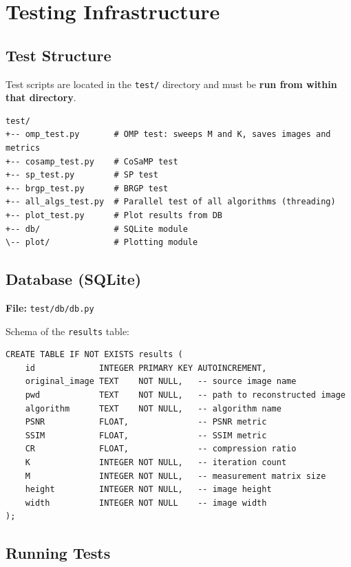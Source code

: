 \documentclass[12pt,a4paper]{article}
\newcommand{\cs}[1]{\texttt{#1}}          %
\begin{document}
\section{Testing Infrastructure}

\subsection{Test Structure}

Test scripts are located in the \cs{test/} directory and must be
\textbf{run from within that directory}.

\begin{lstlisting}
test/
+-- omp_test.py       # OMP test: sweeps M and K, saves images and metrics
+-- cosamp_test.py    # CoSaMP test
+-- sp_test.py        # SP test
+-- brgp_test.py      # BRGP test
+-- all_algs_test.py  # Parallel test of all algorithms (threading)
+-- plot_test.py      # Plot results from DB
+-- db/               # SQLite module
\-- plot/             # Plotting module
\end{lstlisting}

\subsection{Database (SQLite)}

\textbf{File:} \cs{test/db/db.py}

Schema of the \cs{results} table:

\begin{lstlisting}[style=sql]
CREATE TABLE IF NOT EXISTS results (
    id             INTEGER PRIMARY KEY AUTOINCREMENT,
    original_image TEXT    NOT NULL,   -- source image name
    pwd            TEXT    NOT NULL,   -- path to reconstructed image
    algorithm      TEXT    NOT NULL,   -- algorithm name
    PSNR           FLOAT,              -- PSNR metric
    SSIM           FLOAT,              -- SSIM metric
    CR             FLOAT,              -- compression ratio
    K              INTEGER NOT NULL,   -- iteration count
    M              INTEGER NOT NULL,   -- measurement matrix size
    height         INTEGER NOT NULL,   -- image height
    width          INTEGER NOT NULL    -- image width
);
\end{lstlisting}

\subsection{Running Tests}
\end{document}
